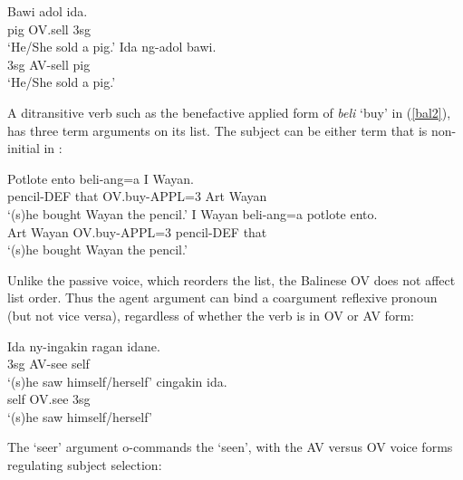 \documentclass[output=paper]{langsci/langscibook}
\begin{document}
\begin{exe}
	\ex\label{bal1}
\begin{xlist}
\ex \label{bal1-a}	\gll Bawi adol ida.  \\
		pig OV.sell 3sg   \\
		\glt `He/She sold a pig.'
\ex	\label{bal1-b}\gll Ida ng-adol bawi.  \\
		3sg AV-sell pig   \\
		\glt `He/She sold a pig.'
\end{xlist}
\end{exe} 

\noindent
A ditransitive verb such as the benefactive applied form of \textit{beli} `buy' in (\ref{bal2}), has three term arguments on its \argst list.  The subject can be either term that is non-initial in \argst{}:

\begin{exe}
	\ex\label{bal2}
\begin{xlist}
\ex 	\gll Potlote ento beli-ang=a I Wayan.  \\
		pencil-DEF that OV.buy-APPL=3 Art Wayan   \\
		\glt `(s)he bought Wayan the pencil.'
\ex 	\gll I Wayan beli-ang=a potlote ento.   \\
		Art Wayan OV.buy-APPL=3 pencil-DEF that   \\
		\glt `(s)he bought Wayan the pencil.'
\end{xlist}
\end{exe} 

\noindent
Unlike the passive voice, which reorders the \argst list, the Balinese OV does not affect \argst list order. 
Thus the agent argument can bind a coargument reflexive pronoun (but not vice versa), regardless of whether the verb is in OV or AV form:

\begin{exe}
	\ex\label{bal3}
\begin{xlist}
\ex 	\gll Ida ny-ingakin ragan idane. \\
		3sg AV-see self\\
		\glt ‘(s)he saw himself/herself’
\ex 	{} cingakin ida. \\
		self OV.see 3sg \\
		\glt ‘(s)he saw himself/herself’
\end{xlist}
\end{exe} 

\noindent
The `seer' argument o-commands the `seen', with the AV versus OV voice forms regulating subject selection:
\end{document}
